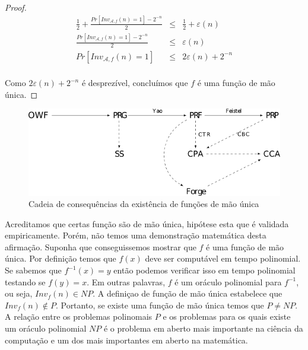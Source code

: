 \begin{proof}
 \begin{eqnarray*}
  \frac{1}{2} + \frac{Pr[Inv_{\mathcal{A},f}(n) = 1] - 2^{-n}}{2} & \leq & \frac{1}{2} + \varepsilon(n)\\
  \frac{Pr[Inv_{\mathcal{A},f}(n) = 1] - 2^{-n}}{2} & \leq & \varepsilon(n)\\
  Pr[Inv_{\mathcal{A},f}(n) = 1] & \leq & 2\varepsilon(n) + 2^{-n}\\
\end{eqnarray*}

Como $2\varepsilon(n) + 2^{-n}$ é desprezível, concluímos que $f$ é uma função de mão única.

\end{proof}

\begin{figure}[htbp]
  \centering
    \includegraphics[width=.7\textwidth]{imagens/OWF-diagrama.png}
  \caption{Cadeia de consequências da existência de funções de mão única}
  \label{fig:owf-seguranca}
\end{figure}

Acreditamos que certas função são de mão única, hipótese esta que é validada empiricamente.
Porém, não temos uma demonstração matemática desta afirmação.
Suponha que conseguissemos mostrar que $f$ é uma função de mão única.
Por definição temos que $f(x)$ deve ser computável em tempo polinomial.
Se sabemos que $f^{-1}(x) = y$ então podemos verificar isso em tempo polinomial testando se $f(y) = x$.
Em outras palavras, $f$ é um oráculo polinomial para $f^{-1}$, ou seja, $Inv_f(n) \in NP$.
A definiçao de função de mão única estabelece que $Inv_f(n) \notin P$.
Portanto, se existe uma função de mão única temos que $P \neq NP$.
A relação entre os problemas polinomais $P$ e os problemas para os quais existe um oráculo polinomial $NP$ é o problema em aberto mais importante na ciência da computação e um dos mais importantes em aberto na matemática.




